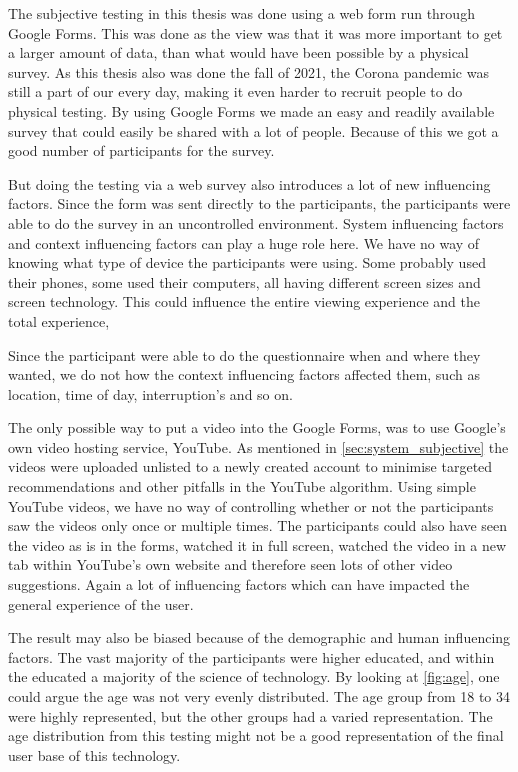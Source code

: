 The subjective testing in this thesis was done using a web form run through Google Forms. This was done as the view was that it was more important to get a larger amount of data, than what would have been possible by a physical survey. As this thesis also was done the fall of 2021, the Corona pandemic was still a part of our every day, making it even harder to recruit people to do physical testing. By using Google Forms we made an easy and readily available survey that could easily be shared with a lot of people. Because of this we got a good number of participants for the survey. 

But doing the testing via a web survey also introduces a lot of new influencing factors. Since the form was sent directly to the participants, the participants were able to do the survey in an uncontrolled environment. System influencing factors and context influencing factors can play a huge role here. We have no way of knowing what type of device the participants were using. Some probably used their phones, some used their computers, all having different screen sizes and screen technology. This could influence the entire viewing experience and the total experience, 

Since the participant were able to do the questionnaire when and where they wanted, we do not how the context influencing factors affected them, such as location, time of day, interruption's and so on. 

The only possible way to put a video into the Google Forms, was to use Google's own video hosting service, YouTube. As mentioned in \autoref{sec:system_subjective} the videos were uploaded unlisted to a newly created account to minimise targeted recommendations and other pitfalls in the YouTube algorithm. Using simple YouTube videos, we have no way of controlling whether or not the participants saw the videos only once or multiple times. The participants could also have seen the video as is in the forms, watched it in full screen, watched the video in a new tab within YouTube's own website and therefore seen lots of other video suggestions. Again a lot of influencing factors which can have impacted the general experience of the user. 

The result may also be biased because of the demographic and human influencing factors. The vast majority of the participants were higher educated, and within the educated a majority of the science of technology. By looking at \autoref{fig:age}, one could argue the age was not very evenly distributed. The age group from 18 to 34 were highly represented, but the other groups had a varied representation. The age distribution from this testing might not be a good representation of the final user base of this technology. 


